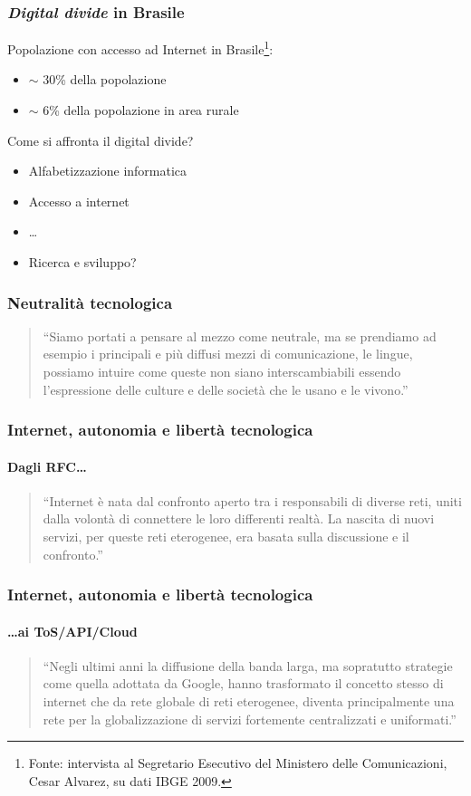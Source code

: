 \documentclass{beamer}
\begin{document}
\begin{frame}

  \frametitle{\emph{Digital divide} in Brasile}
  Popolazione con accesso ad Internet in Brasile\footnote{Fonte: intervista al Segretario Esecutivo del Ministero delle
    Comunicazioni, Cesar Alvarez, su dati IBGE 2009.}:
  \begin{itemize}
    \item $\sim$ 30\% della popolazione
    \item $\sim$ 6\% della popolazione in area rurale  
  \end{itemize}
  \vfill
  Come si affronta il digital divide?
  \begin{itemize}
    \item Alfabetizzazione informatica
    \item Accesso a internet
    \item \ldots
    \item Ricerca e sviluppo?
    \end{itemize}

 \end{frame}

\begin{frame}

  \frametitle{Neutralità tecnologica}

  \begin{quote}
    ``Siamo portati a pensare al mezzo come neutrale, ma se prendiamo
    ad esempio i principali e più diffusi mezzi di comunicazione, le
    lingue, possiamo intuire come queste non siano interscambiabili
    essendo l'espressione delle culture e delle società che le usano e
    le vivono.''
  \end{quote}
  
\end{frame}


\begin{frame}
  \frametitle{Internet, autonomia e libertà tecnologica}
  \framesubtitle{Dagli RFC\ldots}
  \begin{quote}
  ``Internet è nata dal confronto aperto tra i responsabili di diverse
  reti, uniti dalla volontà di connettere le loro differenti
  realtà. La nascita di nuovi servizi, per queste reti eterogenee, era
  basata sulla discussione e il confronto.'' 
\end{quote}

\end{frame}

\begin{frame}
  \frametitle{Internet, autonomia e libertà tecnologica}
  \framesubtitle{\ldots ai ToS/API/Cloud}
  \begin{quote}
  ``Negli ultimi anni la diffusione della banda larga, ma sopratutto
  strategie come quella adottata da Google, hanno  trasformato il 
  concetto stesso di internet che da rete globale di reti eterogenee,
  diventa principalmente una rete per la globalizzazione di servizi
  fortemente centralizzati e uniformati.'' 
  \end{quote}
\end{frame}
\end{document}
